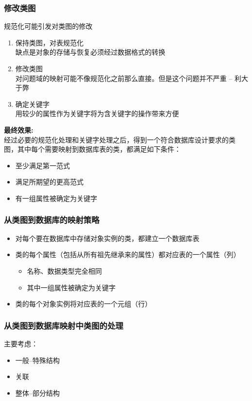 \documentclass[compress]{beamer}
\begin{document}
\begin{frame}
  \frametitle{修改类图}
   {
  规范化可能引发对类图的修改

  \begin{enumerate}
    \item 保持类图，对表规范化 \\
   缺点是对象的存储与恢复必须经过数据格式的转换 

    \item 修改类图 \\
   对问题域的映射可能不像规范化之前那么直接。但是这个问题并不严重
  -- 利大于弊
    \item 确定关键字 \\
      用较少的属性作为关键字将为含关键字的操作带来方便
  \end{enumerate}
}

   {
    \textbf{最终效果:} \\
    经过必要的规范化处理和关键字处理之后，得到一个符合数据库设计要求的类
    图，其中每个需要映射到数据库表的类，都满足如下条件：
    \begin{itemize}
      \item 至少满足第一范式
      \item 满足所期望的更高范式
      \item 有一组属性被确定为关键字
    \end{itemize}
  }

\end{frame}

\begin{frame}
  \frametitle{从类图到数据库的映射策略}
  \begin{itemize}
    \item 对每个要在数据库中存储对象实例的类，都建立一个数据库表

    \item 类的每个属性（包括从所有祖先继承来的属性）都对应表的一个属性（列）
      \begin{itemize}
        \item 名称、数据类型完全相同
        \item 其中一组属性被确定为关键字
      \end{itemize}

    \item 类的每个对象实例将对应表的一个元组（行）
  \end{itemize}
\end{frame}

\begin{frame}
  \frametitle{从类图到数据库映射中类图的处理}
  主要考虑：
  \begin{itemize}
    \item 一般--特殊结构
    \item 关联
    \item 整体--部分结构
  \end{itemize}
\end{frame}
\end{document}
